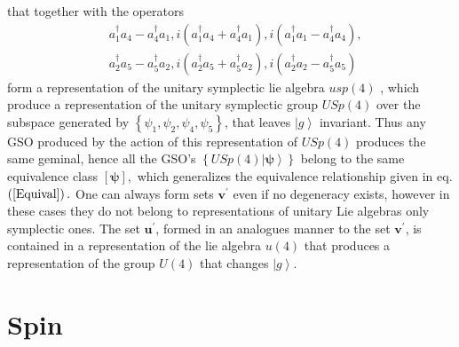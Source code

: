 \documentclass[aps,preprint]{revtex4}%
\begin{document}
that together with the operators
\begin{align}
&  a_{1}^{\dagger}a_{4}-a_{4}^{\dagger}a_{1},i\left(  a_{1}^{\dagger}%
a_{4}+a_{4}^{\dagger}a_{1}\right)  ,i\left(  a_{1}^{\dagger}a_{1}%
-a_{4}^{\dagger}a_{4}\right)  ,\nonumber\\
&  a_{2}^{\dagger}a_{5}-a_{5}^{\dagger}a_{2},i\left(  a_{2}^{\dagger}%
a_{5}+a_{5}^{\dagger}a_{2}\right)  ,i\left(  a_{2}^{\dagger}a_{2}%
-a_{5}^{\dagger}a_{5}\right)
\end{align}
form a representation of the unitary symplectic lie algebra $usp\left(
4\right)  $ \cite{Gilmore_book}, which produce a representation of the unitary
symplectic group $USp\left(  4\right)  $ \cite{Gilmore_book} over the subspace
generated by $\left\{  \psi_{1},\psi_{2},\psi_{4},\psi_{5}\right\}  $, that
leaves $\left\vert g\right\rangle $ invariant. Thus any GSO produced by the
action of this representation of $USp\left(  4\right)  $ produces the same
geminal, hence all the GSO's $\left\{  USp\left(  4\right)  \left\vert
\boldsymbol{\psi}\right\rangle \right\}  $ belong to the same equivalence
class $\left[  \boldsymbol{\psi}\right]  ,$ which generalizes the equivalence
relationship given in eq. $\left(  \ref{Equival}\right)  .$ One can always
form sets $\boldsymbol{v}^{\prime}$ even if no degeneracy exists, however in
these cases they do not belong to representations of unitary Lie algebras only
symplectic ones. The set $\boldsymbol{u}^{\prime}$, formed in an analogues
manner to the set $\boldsymbol{v}^{\prime}$, is contained in a representation
of the lie algebra $u\left(  4\right)  $ that produces a representation of the
group $U\left(  4\right)  $ that changes $\left\vert g\right\rangle .$

\section{Spin\label{Spin}}
\end{document}
